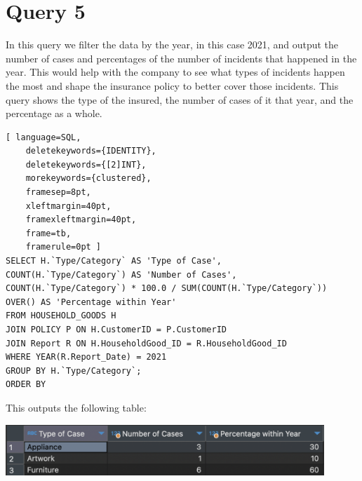 \documentclass{article}
\begin{document}
\section*{Query 5}

In this query we filter the data by the year, in this case 2021, and output the number of cases and percentages of the number of incidents that happened in the year. This would help with the company to see what types of incidents happen the most and shape the insurance policy to better cover those incidents. This query shows the type of the insured, the number of cases of it that year, and the percentage as a whole.

\begin{lstlisting}[ language=SQL,
    deletekeywords={IDENTITY},
    deletekeywords={[2]INT},
    morekeywords={clustered},
    framesep=8pt,
    xleftmargin=40pt,
    framexleftmargin=40pt,
    frame=tb,
    framerule=0pt ]
SELECT H.`Type/Category` AS 'Type of Case', 
COUNT(H.`Type/Category`) AS 'Number of Cases', 
COUNT(H.`Type/Category`) * 100.0 / SUM(COUNT(H.`Type/Category`)) OVER() AS 'Percentage within Year'
FROM HOUSEHOLD_GOODS H
JOIN POLICY P ON H.CustomerID = P.CustomerID
JOIN Report R ON H.HouseholdGood_ID = R.HouseholdGood_ID
WHERE YEAR(R.Report_Date) = 2021
GROUP BY H.`Type/Category`;
ORDER BY 
\end{lstlisting}

This outputs the following table:

\begin{center}
    \includegraphics[width=0.9\textwidth]{./images/Q5.png}
\end{center}

\end{document}
